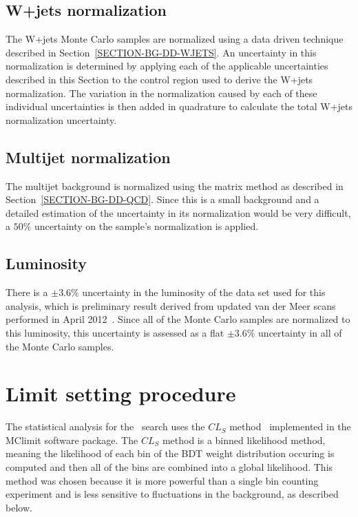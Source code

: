 \subsection{W+jets normalization}
\label{SECTION-RESULTS-SYSTEMATICS-WJETS}
The W+jets Monte Carlo samples are normalized using a data driven technique described in Section~\ref{SECTION-BG-DD-WJETS}. An uncertainty in this normalization is determined by applying each of the applicable uncertainties described in this Section to the control region used to derive the W+jets normalization. The variation in the normalization caused by each of these individual uncertainties is then added in quadrature to calculate the total W+jets normalization uncertainty.

\subsection{Multijet normalization}
\label{SECTION-RESULTS-SYSTEMATICS-MULTIJET}
The multijet background is normalized using the matrix method as described in Section~\ref{SECTION-BG-DD-QCD}. Since this is a small background and a detailed estimation of the uncertainty in its normalization would be very difficult, a $50\%$ uncertainty on the sample's normalization is applied.

\subsection{Luminosity}
\label{SECTION-RESULTS-SYSTEMATICS-LUMI}
There is a $\pm 3.6\%$ uncertainty in the luminosity of the data set used for this analysis, which is preliminary result derived from updated van der Meer scans performed in April 2012~\cite{LUMI}. Since all of the Monte Carlo samples are normalized to this luminosity, this uncertainty is assessed as a flat $\pm 3.6\%$ uncertainty in all of the Monte Carlo samples.


\section{Limit setting procedure}
\label{SECTION-RESULTS-LIMITS}
The statistical analysis for the \Wprimechan\ search uses the $CL_S$ method~\cite{CLS,CLS2} implemented in the MClimit software package. The $CL_S$ method is a binned likelihood method, meaning the likelihood of each bin of the BDT weight distribution occuring is computed and then all of the bins are combined into a global likelihood. This method was chosen because it is more powerful than a single bin counting experiment and is less sensitive to fluctuations in the background, as described below.

